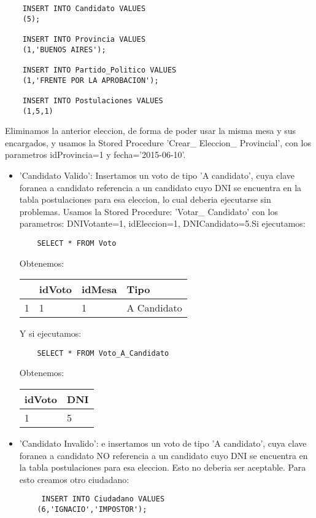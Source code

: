 \begin{enumerate}
\begin{lstlisting}
  	INSERT INTO Candidato VALUES
 	(5);

	INSERT INTO Provincia VALUES
 	(1,'BUENOS AIRES');
 	 
 	INSERT INTO Partido_Politico VALUES
	(1,'FRENTE POR LA APROBACION');
	
	INSERT INTO Postulaciones VALUES
	(1,5,1)
	\end{lstlisting}
	
Eliminamos la anterior eleccion, de forma de poder usar la misma mesa y sus encargados, y usamos la Stored Procedure 'Crear\_ Eleccion\_ Provincial', con los parametros idProvincia=1 y fecha='2015-06-10'.

	\begin{itemize}
	\item 'Candidato Valido': Insertamos un voto de tipo 'A candidato', cuya clave foranea a candidato referencia a un candidato cuyo DNI se encuentra en la tabla postulaciones para esa eleccion, lo cual deberia ejecutarse sin problemas. Usamos la Stored Procedure: 'Votar\_ Candidato' con los parametros: DNIVotante=1, idEleccion=1, DNICandidato=5.Si ejecutamos:
	\begin{lstlisting}
	SELECT * FROM Voto
	\end{lstlisting}
	
	Obtenemos:
	
	\begin{tabular}{| l| l| l| l| }
	\hline 
	   & idVoto & idMesa & Tipo \\
	   \hline
	 1 & 1 & 1 & A Candidato \\
 	 \hline 
	\end{tabular}
	\vspace{2mm}	
	
	Y si ejecutamos: 
	
	\begin{lstlisting}
	SELECT * FROM Voto_A_Candidato
	\end{lstlisting}
	
	Obtenemos:
	
	\begin{tabular}{| l| l|}
	\hline 
	   idVoto & DNI \\
	   \hline
	 1 & 5  \\
 	 \hline 
	\end{tabular}
	\vspace{2mm}
	
	\item 'Candidato Invalido': e insertamos un voto de tipo 'A candidato', cuya clave foranea a candidato NO referencia a un candidato cuyo DNI se encuentra en la tabla postulaciones para esa eleccion. Esto no deberia ser aceptable. Para esto creamos otro ciudadano:
	\begin{lstlisting}
	 INSERT INTO Ciudadano VALUES
 	(6,'IGNACIO','IMPOSTOR');
	\end{lstlisting}
	

\end{itemize}
\end{enumerate}
